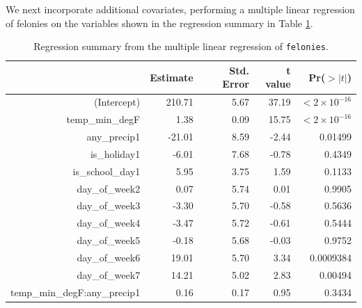 \documentclass[11pt,notitlepage]{article}
\newenvironment{codeSmall}%
   {\par\noindent\adjustbox{margin=1ex,bgcolor=shadecolor,margin=0ex \medskipamount}\bgroup\minipage\linewidth\verbatim\footnotesize}%
   {\endverbatim\endminipage\egroup}
\begin{document}
We next incorporate additional covariates, performing a multiple linear regression of felonies on the variables shown in the regression summary in Table \ref{tab:lm4}.




\begin{table}[ht]
\vspace*{-1mm}
\footnotesize
\centering
\begin{tabular}{rrrrr}
  \hline
 & Estimate & Std. Error & t value & Pr($>|t|$) \\ 
  \hline
(Intercept) & 210.71 & 5.67 & 37.19 & $<2 \times 10^{-16}$ \\ 
  temp\_min\_degF & 1.38 & 0.09 & 15.75 & $<2 \times 10^{-16}$ \\ 
  any\_precip1 & -21.01 & 8.59 & -2.44 & 0.01499 \\ 
  is\_holiday1 & -6.01 & 7.68 & -0.78 & 0.4349 \\ 
  is\_school\_day1 & 5.95 & 3.75 & 1.59 & 0.1133 \\ 
  day\_of\_week2 & 0.07 & 5.74 & 0.01 & 0.9905 \\ 
  day\_of\_week3 & -3.30 & 5.70 & -0.58 & 0.5636 \\ 
  day\_of\_week4 & -3.47 & 5.72 & -0.61 & 0.5444 \\ 
  day\_of\_week5 & -0.18 & 5.68 & -0.03 & 0.9752 \\ 
  day\_of\_week6 & 19.01 & 5.70 & 3.34 & 0.0009384 \\ 
  day\_of\_week7 & 14.21 & 5.02 & 2.83 & 0.00494 \\ 
  temp\_min\_degF:any\_precip1 & 0.16 & 0.17 & 0.95 & 0.3434 \\ 
   \hline
\end{tabular}
\captionsetup{width=0.9\textwidth}
\vspace*{-2mm}
\caption{Regression summary from the multiple linear regression of \texttt{felonies}.}
\label{tab:lm4}   
\vspace*{-3mm}
\end{table}
\end{document}
